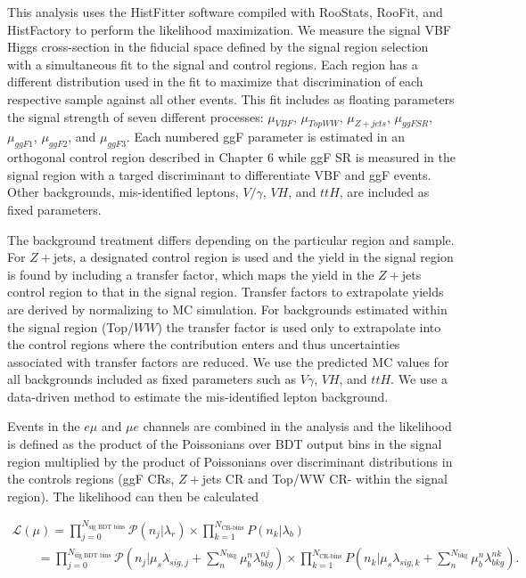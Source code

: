 This analysis uses the HistFitter software compiled with RooStats, RooFit, and HistFactory to perform the likelihood maximization. We measure the signal VBF Higgs cross-section in the fiducial space defined by the signal region selection with a simultaneous fit to the signal and control regions. Each region has a different distribution used in the fit to maximize that discrimination of each respective sample against all other events. This fit includes as floating parameters the signal strength of seven different processes: $\mu_{VBF}$, $\mu_{TopWW}$, $\mu_{Z+jets}$, $\mu_{ggFSR}$, $\mu_{ggF1}$, $\mu_{ggF2}$, and $\mu_{ggF3}$. Each numbered ggF parameter is estimated in an orthogonal control region described in Chapter 6 while ggF SR is measured in the signal region with a targed discriminant to differentiate VBF and ggF events. Other backgrounds, mis-identified leptons, $V/\gamma$, $VH$, and $ttH$, are included as fixed parameters. 

The background treatment differs depending on the particular region and sample. For $Z+$jets, a designated control region is used and the yield in the signal region is found by including a transfer factor, which maps the yield in the $Z+$jets control region to that in the signal region. Transfer factors to extrapolate yields are derived by normalizing to MC simulation. For backgrounds estimated within the signal region (Top/$WW$) the transfer factor is used only to extrapolate into the control regions where the contribution enters and thus uncertainties associated with transfer factors are reduced. We use the predicted MC values for all backgrounds included as fixed parameters such as $V\gamma$, $VH$, and $ttH$. We use a data-driven method to estimate the mis-identified lepton background. 

Events in the $e\mu$ and $\mu e$ channels are combined in the analysis and the likelihood is defined as the product of the Poissonians over BDT output bins in the signal region multiplied by the product of Poissonians over discriminant distributions in the controls regions (ggF CRs, $Z+$jets CR and Top/WW CR- within the signal region). The likelihood can then be calculated 

\begin{equation}
  \begin{aligned}
\mathcal{L}(\mu) = \displaystyle\prod_{j=0}^{N_{\text{sig BDT bins}}} \mathcal{P} (n_{j}|\lambda_r) \times \displaystyle\prod_{k=1}^{N_{\text{CR-bins}}} P(n_{k}|\lambda_b) \\
\qquad = \displaystyle\prod_{j=0}^{N_{\text{sig BDT bins}}} \mathcal{P} (n_{j}|\mu_s \lambda_{sig,j} + \displaystyle\sum_{n}^{N_{\text{bkg}}}\mu_b^{n} \lambda_{bkg}^{nj}) \times \displaystyle\prod_{k=1}^{N_{\text{CR-bins}}} P(n_{k}|\mu_s \lambda_{sig,k} + \displaystyle\sum_{n}^{N_{\text{bkg}}}\mu_b^{n} \lambda_{bkg}^{nk}).
  \end{aligned}
\end{equation}

